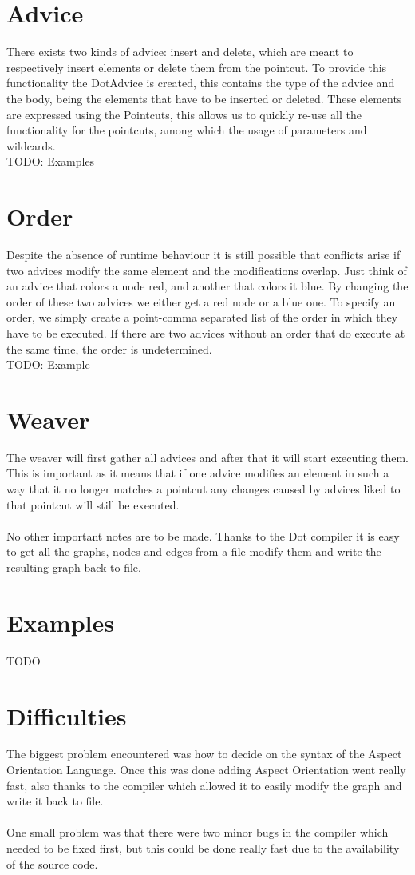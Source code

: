 \documentclass[a4paper]{report}
\begin{document}
\section{Advice}
There exists two kinds of advice: insert and delete, which are meant to respectively insert elements or delete them from the pointcut. To provide this functionality the DotAdvice is created, this contains the type of the advice and the body, being the elements that have to be inserted or deleted. These elements are expressed using the Pointcuts, this allows us to quickly re-use all the functionality for the pointcuts, among which the usage of parameters and wildcards.\\
TODO: Examples

\section{Order}
Despite the absence of runtime behaviour it is still possible that conflicts arise if two advices modify the same element and the modifications overlap. Just think of an advice that colors a node red, and another that colors it blue. By changing the order of these two advices we either get a red node or a blue one. To specify an order, we simply create a point-comma separated list of the order in which they have to be executed. If there are two advices without an order that do execute at the same time, the order is undetermined.\\
TODO: Example

\section{Weaver}
The weaver will first gather all advices and after that it will start executing them. This is important as it means that if one advice modifies an element in such a way that it no longer matches a pointcut any changes caused by advices liked to that pointcut will still be executed.\\
\\
No other important notes are to be made. Thanks to the Dot compiler it is easy to get all the graphs, nodes and edges from a file modify them and write the resulting graph back to file.

\section{Examples}
TODO

\section{Difficulties}
The biggest problem encountered was how to decide on the syntax of the Aspect Orientation Language. Once this was done adding Aspect Orientation went really fast, also thanks to the compiler which allowed it to easily modify the graph and write it back to file.\\
\\
One small problem was that there were two minor bugs in the compiler which needed to be fixed first, but this could be done really fast due to the availability of the source code.
\end{document}
